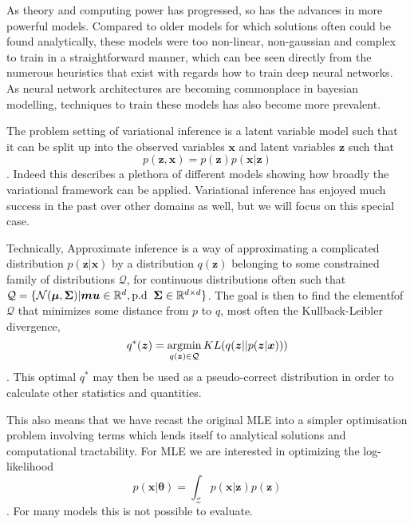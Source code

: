 As theory and computing power has progressed, so has the advances in more
powerful models. Compared to older models for which solutions often could be
found analytically, these models were too non-linear, non-gaussian and complex
to train in a straightforward manner, which can bee seen directly from the
numerous heuristics that exist with regards how to train deep neural
networks\cite{bengio_practical_2012, Larochelle:2009:EST:1577069.1577070}. As
neural network architectures are becoming commonplace in bayesian modelling,
techniques to train these models has also become more prevalent.

The problem setting of variational inference is a latent variable model such
that it can be split up into the observed variables $\bm{x}$ and latent
variables $\bm{z}$ such that
\begin{equation}
  \label{eq:latent_var_model}
  p(\bm{z}, \bm{x}) = p(\bm{z})p(\bm{x} | \bm{z})
\end{equation}.
Indeed this describes a plethora of different models showing how broadly the
variational framework can be applied. Variational inference has enjoyed much
success in the past over other domains as well\cite{beal2003}, but we will focus
on this special case.

Technically, Approximate inference is a way of approximating
a complicated distribution $p(\bm{z} | \bm{x})$ by a distribution $q(\bm{z})$ belonging
to some constrained family of distributions $\mathcal{Q}$, for continuous
distributions often such that $\mathcal{Q} = \{\mathcal{N}(\bm{\mu},
\bm{\Sigma}) | \bm{mu} \in \mathbb{R}^d, \text{p.d \:} \bm{\Sigma} \in
\mathbb{R}^{d \times d}\}$. The goal is then to find the elementfof $\mathcal{Q}$
that minimizes some distance from $p$ to $q$, most often the Kullback-Leibler
divergence,
\begin{equation}
  \label{eq:AI_optimal_element}
  q^*(\bm{z}) = \operatorname*{\arg\!\min}_{q(\bm{z}) \in \mathcal{Q}} KL(q(\bm{z} || p(\bm{z} | \bm{x})))
\end{equation}.
This optimal $q^*$ may then be used as a pseudo-correct
distribution in order to calculate other statistics and quantities.

This also means that we have recast the original MLE into a simpler optimisation
problem involving terms which lends itself to analytical solutions and
computational tractability. For MLE we are interested in optimizing the
log-likelihood
\begin{equation*}
  p(\bm{x} | \bm{\theta}) = \int_{\mathcal{Z}}p(\bm{x} | \bm{z})p(\bm{z})
\end{equation*}. For many models this is not possible to evaluate. 

